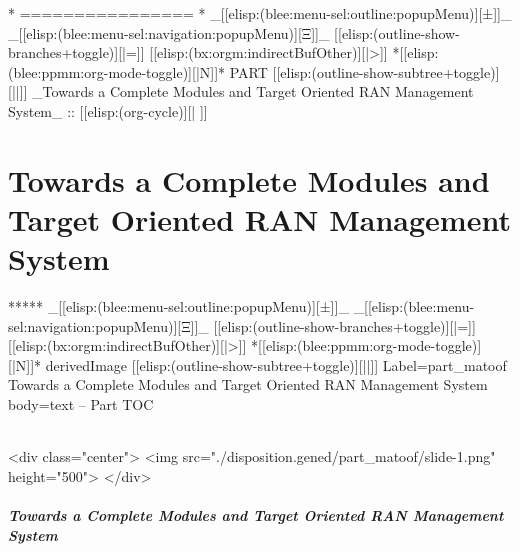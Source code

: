 
\begin{whenOrg}
*      ================
*  _[[elisp:(blee:menu-sel:outline:popupMenu)][±]]_ _[[elisp:(blee:menu-sel:navigation:popupMenu)][Ξ]]_ [[elisp:(outline-show-branches+toggle)][|=]] [[elisp:(bx:orgm:indirectBufOther)][|>]] *[[elisp:(blee:ppmm:org-mode-toggle)][|N]]*  PART       [[elisp:(outline-show-subtree+toggle)][||]]   _Towards a Complete Modules and Target Oriented RAN Management System_ ::  [[elisp:(org-cycle)][| ]]
\end{whenOrg}

\newpage
\part{Towards a Complete Modules and Target Oriented RAN Management System}


\begin{whenOrg}
*****  _[[elisp:(blee:menu-sel:outline:popupMenu)][±]]_ _[[elisp:(blee:menu-sel:navigation:popupMenu)][Ξ]]_ [[elisp:(outline-show-branches+toggle)][|=]] [[elisp:(bx:orgm:indirectBufOther)][|>]] *[[elisp:(blee:ppmm:org-mode-toggle)][|N]]*  derivedImage [[elisp:(outline-show-subtree+toggle)][||]] Label=part_matoof Towards a Complete Modules and Target Oriented RAN Management System body=text -- Part TOC
\end{whenOrg}

\begin{htmlonly}

\begin{frame}[fragile,plain,label=part_matoof]
    \frametitle{}
    \framesubtitle{}
    \begin{rawhtml}
<div class="center">
<img src="./disposition.gened/part_matoof/slide-1.png" height="500">
</div>
    \end{rawhtml}
\end{frame}
\end{htmlonly}

\begin{verblatex}

\begin{frame}[fragile,label=part_matoof]
    \frametitle{Towards a Complete Modules and Target Oriented RAN Management System}
    \framesubtitle{}

    \tableofcontents

\pnote{

}

\end{frame}
\end{verblatex}


